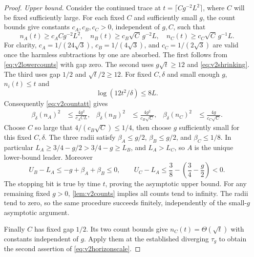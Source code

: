 \documentclass{article}
\theoremstyle{plain}
\theoremstyle{definition}
\begin{document}
\begin{proof}
\emph{Upper bound.} Consider the continued trace at
$t=\lceil Cg^{-2}L^2\rceil$, where $C$ will be fixed sufficiently large.
For each fixed $C$ and sufficiently small $g$, the count bounds give
constants $c_A,c_B,c_C>0$, independent of $g,C$, such that
\begin{equation}
 n_A(t)\ge c_A Cg^{-2}L^2,\quad
 n_B(t)\ge c_B\sqrt C\,g^{-2}L,\quad
 n_C(t)\ge c_C\sqrt C\,g^{-1}L.
 \label{eq:v2countatt}
\end{equation}
For clarity, $c_A=1/(24\sqrt3)$,
$c_B=1/(4\sqrt3)$, and $c_C=1/(2\sqrt3)$ are valid once the harmless
subtractions by one are absorbed. The first follows from
\eqref{eq:v2lowercounts} with gap zero. The second uses
$g\sqrt t\ge12$ and \eqref{eq:v2shrinking}. The third uses gap $1/2$
and $\sqrt t/2\ge12$.
For fixed $C,\delta$ and small enough $g$, $n_i(t)\le t$ and
\[
 \log(12t^2/\delta)\le8L.
\]
Consequently \eqref{eq:v2countatt} gives
\begin{align*}
 \beta_\delta(n_A)^2&\le\frac{4g^2}{c_A C L},&
 \beta_\delta(n_B)^2&\le\frac{4g^2}{c_B\sqrt C},&
 \beta_\delta(n_C)^2&\le\frac{4g}{c_C\sqrt C}.
\end{align*}
Choose $C$ so large that $4/(c_B\sqrt C)\le1/4$, then choose $g$
sufficiently small for this fixed $C,\delta$. The three radii satisfy
$\beta_A\le g/2$, $\beta_B\le g/2$, and $\beta_C\le1/8$.
In particular
$L_A\ge3/4-g/2>3/4-g\ge L_B$, and $L_A>L_C$,
so $A$ is the unique lower-bound leader. Moreover
\[
 U_B-L_A\le-g+\beta_A+\beta_B\le0,\qquad
 U_C-L_A\le\frac38-\left(\frac34-\frac g2\right)<0.
\]
The stopping bit is true by time $t$, proving the asymptotic upper bound.
For any remaining fixed $g>0$, \cref{lem:v2counts} implies all counts
tend to infinity. The radii tend to zero, so the same procedure
succeeds finitely, independently of the small-$g$ asymptotic argument.

Finally $C$ has fixed gap $1/2$. Its two count bounds give
$n_C(t)=\Theta(\sqrt t)$ with constants independent of $g$. Apply them
at the established diverging $\tau_g$ to obtain the second assertion
of \eqref{eq:v2horizonscale}.
\end{proof}
\end{document}
